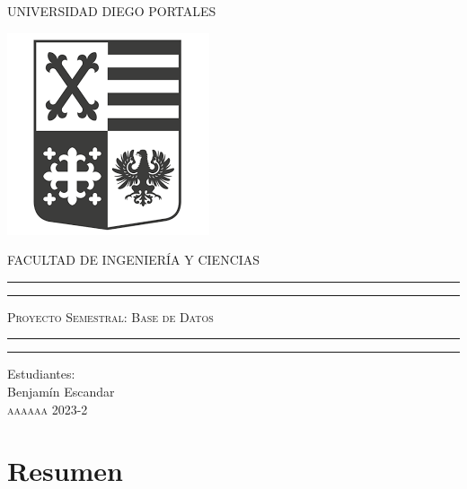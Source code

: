 \documentclass{article}[10pt]
\begin{document}
\begin{titlepage}
\centering
\vspace{1cm}
{\Large UNIVERSIDAD DIEGO PORTALES \par}
\vspace{0.5cm}
{\includegraphics[scale=0.5]{logo.png}\par}
\vspace{0.5cm}
{\scshape\Large FACULTAD DE INGENIERÍA Y CIENCIAS \par}

\vspace{3cm}

\hrule height 0.5pt
\vspace{1mm}
\hrule height 1.5pt
\vspace{1cm}
{\scshape\Huge Proyecto Semestral: Base de Datos \par}
\vspace{1cm}
\hrule height 1.5pt
\vspace{1mm}
\hrule height 0.5pt

\vspace{3cm}

\Large Estudiantes:\\ Benjamín Escandar \\ 

\vfill \small \scshape aaaaaa \hfill 2023-2
\end{titlepage}

\clearpage

\section*{Resumen}
\end{document}
